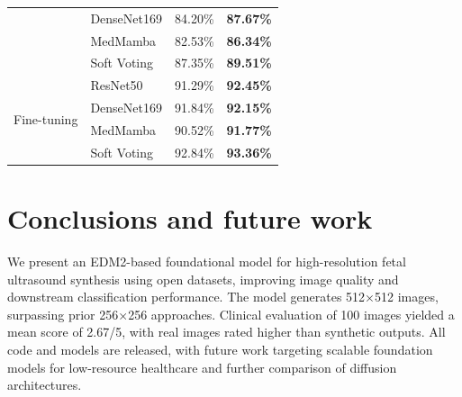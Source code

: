 \documentclass[runningheads]{llncs}
\begin{document}
\begin{table}[htbp]
\begin{minipage}{0.56\textwidth}
\begin{tabular}{llcc}
      & DenseNet169  & 84.20\%  & \bf 87.67\% \\
      & MedMamba     & 82.53\%  & \bf 86.34\% \\
      & Soft Voting  & 87.35\%  & \bf 89.51\% \\
      \midrule
      \multirow{4}{*}{Fine-tuning}
      & ResNet50     & 91.29\% & \bf 92.45\% \\
      & DenseNet169  &  91.84\% & \bf 92.15\% \\
      & MedMamba     & 90.52\% & \bf 91.77\% \\
      & Soft Voting  & 92.84\% & \bf 93.36\% \\
      \bottomrule
    \end{tabular}
  \end{minipage}
\end{table}



\section{Conclusions and future work}
We present an EDM2-based foundational model for high-resolution fetal ultrasound synthesis using open datasets, improving image quality and downstream classification performance. The model generates 512×512 images, surpassing prior 256×256 approaches. Clinical evaluation of 100 images yielded a mean score of 2.67/5, with real images rated higher than synthetic outputs. All code and models are released, with future work targeting scalable foundation models for low-resource healthcare and further comparison of diffusion architectures.

\end{document}
